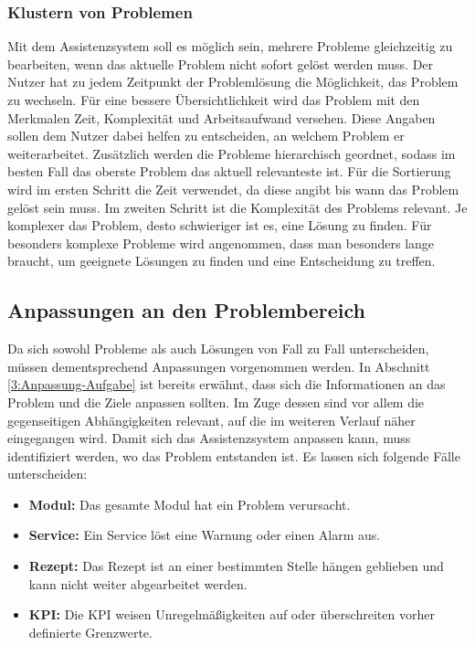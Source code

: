 \subsubsection*{Klustern von Problemen}
Mit dem Assistenzsystem soll es möglich sein, mehrere Probleme gleichzeitig zu bearbeiten, wenn das aktuelle Problem nicht sofort gelöst werden muss. Der Nutzer hat zu jedem Zeitpunkt der Problemlösung die Möglichkeit, das Problem zu wechseln. Für eine bessere Übersichtlichkeit wird das Problem mit den Merkmalen Zeit, Komplexität und Arbeitsaufwand versehen. Diese Angaben sollen dem Nutzer dabei helfen zu entscheiden, an welchem Problem er weiterarbeitet. Zusätzlich werden die Probleme hierarchisch geordnet, sodass im besten Fall das oberste Problem das aktuell relevanteste ist. Für die Sortierung wird im ersten Schritt die Zeit verwendet, da diese angibt bis wann das Problem gelöst sein muss. Im zweiten Schritt ist die Komplexität des Problems relevant. Je komplexer das Problem, desto schwieriger ist es, eine Lösung zu finden. Für besonders komplexe Probleme wird angenommen, dass man besonders lange braucht, um geeignete Lösungen zu finden und eine Entscheidung zu treffen. 

\subsection{Anpassungen an den Problembereich}
\label{4:Anpassung-Problembereich}
Da sich sowohl Probleme als auch Lösungen von Fall zu Fall unterscheiden, müssen dementsprechend Anpassungen vorgenommen werden. In Abschnitt \ref{3:Anpassung-Aufgabe} ist bereits erwähnt, dass sich die Informationen an das Problem und die Ziele anpassen sollten. Im Zuge dessen sind vor allem die gegenseitigen Abhängigkeiten relevant, auf die im weiteren Verlauf näher eingegangen wird. Damit sich das Assistenzsystem anpassen kann, muss identifiziert werden, wo das Problem entstanden ist. Es lassen sich folgende Fälle unterscheiden:
\begin{itemize}
\item \textbf{Modul:} Das gesamte Modul hat ein Problem verursacht.
\item \textbf{Service:} Ein Service löst eine Warnung oder einen Alarm aus.
\item \textbf{Rezept:} Das Rezept ist an einer bestimmten Stelle hängen geblieben und kann nicht weiter abgearbeitet werden.
\item \textbf{KPI:} Die KPI weisen Unregelmäßigkeiten auf oder überschreiten vorher definierte Grenzwerte.
\end{itemize}

